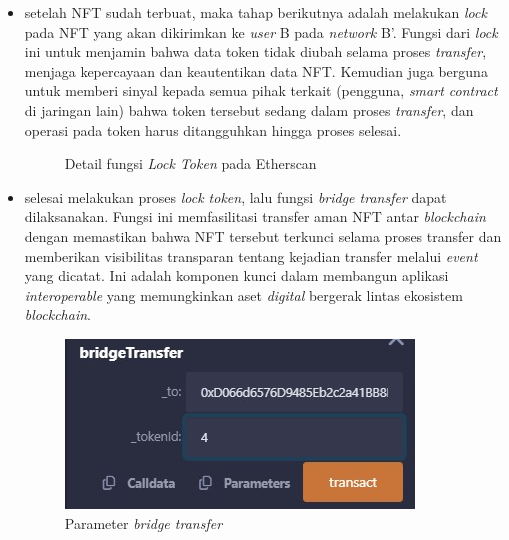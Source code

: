 \begin{itemize}
    \item setelah NFT sudah terbuat, maka tahap berikutnya adalah melakukan \emph{lock} pada NFT yang akan dikirimkan ke \emph{user} B pada \emph{network} B'. Fungsi dari \emph{lock} ini untuk menjamin bahwa data token tidak diubah selama proses \emph{transfer}, menjaga kepercayaan dan keautentikan data NFT. Kemudian juga berguna untuk memberi sinyal kepada semua pihak terkait (pengguna, \emph{smart contract} di jaringan lain) bahwa token tersebut sedang dalam proses \emph{transfer}, dan operasi pada token harus ditangguhkan hingga proses selesai.

    \begin{figure} [H] \centering
    \caption{Detail fungsi \emph{Lock Token} pada Etherscan}
    \label{fig:locktoken}
    \end{figure}

    \item selesai melakukan proses \emph{lock token}, lalu fungsi \emph{bridge transfer} dapat dilaksanakan. Fungsi ini memfasilitasi transfer aman NFT antar \emph{blockchain} dengan memastikan bahwa NFT tersebut terkunci selama proses transfer dan memberikan visibilitas transparan tentang kejadian transfer melalui \emph{event} yang dicatat. Ini adalah komponen kunci dalam membangun aplikasi \emph{interoperable} yang memungkinkan aset \emph{digital} bergerak lintas ekosistem \emph{blockchain}.

    \begin{figure} [H] \centering
    \includegraphics[scale=0.75]{gambar/bridge_transfer.jpeg}
    \caption{Parameter \emph{bridge transfer}}
    \label{fig:bridge_tranfer}
    \end{figure}


\end{itemize}
